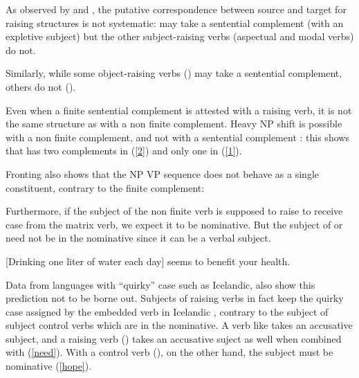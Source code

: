 \documentclass[output=paper]{langsci/langscibook}
\begin{document}
 As observed by \citet{Bresnan1982} and \citet{SagandPollard1991}, the putative correspondence between source and target for raising structures is not systematic:  may take a sentential complement (with an expletive subject) but the other subject-raising verbs (aspectual and modal verbs) do not. 


\eal
{}
\zl
\eal
{}
\zl
 
 Similarly, while some object-raising verbs () may take a sentential complement, others do not ().
 
\eal
{}
\zl
\eal
{}
\zl

Even when a finite sentential complement is attested with a raising verb, it is not the same structure as  with a non finite complement. Heavy NP shift is possible with a non finite complement, and not with a sentential complement \citet{Bresnan1982}: this shows that  has two complements in (\ref{2}) and only one in (\ref{1}).

\eal
{}
\zl

Fronting also shows that the NP VP sequence does not behave as a single constituent, contrary to the finite complement:

\eal
{}
\zl


 Furthermore, if the subject of the non finite verb is supposed to raise to receive case from the matrix verb, we expect it to be nominative. 
 But the subject of  or  need not be in the nominative since it can be a verbal subject.
 
	
\ea 
{}[Drinking one liter of water each day] seems to benefit your health.
\z

Data from languages with ``quirky'' case such as Icelandic, also show this prediction not to be borne out.  Subjects of raising verbs in fact keep the quirky case assigned by the embedded verb in Icelandic \citep{Zaenenetal1985}, contrary to the subject of subject control verbs which are in the nominative. A verb like  takes an accusative subject, and a raising verb () takes an accusative suject as well when combined with  (\ref{need}). With a control verb (), on the other hand, the subject must be nominative (\ref{hope}).
\end{document}
